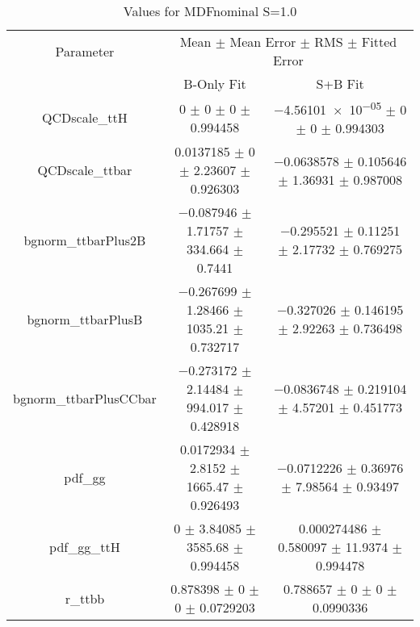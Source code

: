\begin{table}
\centering
\caption{Values for MDFnominal S=1.0}
\begin{tabular}{ccc}
\toprule
Parameter & \multicolumn{2}{c}{Mean $\pm$ Mean Error $\pm$ RMS $\pm$ Fitted Error}\\
 & B-Only Fit & S+B Fit\\
\midrule
QCDscale\_ttH & \num{0} $\pm$ \num{0} $\pm$ \num{0} $\pm$ \num{0.994458} & \num{-4.56101e-05} $\pm$ \num{0} $\pm$ \num{0} $\pm$ \num{0.994303}\\
QCDscale\_ttbar & \num{0.0137185} $\pm$ \num{0} $\pm$ \num{2.23607} $\pm$ \num{0.926303} & \num{-0.0638578} $\pm$ \num{0.105646} $\pm$ \num{1.36931} $\pm$ \num{0.987008}\\
bgnorm\_ttbarPlus2B & \num{-0.087946} $\pm$ \num{1.71757} $\pm$ \num{334.664} $\pm$ \num{0.7441} & \num{-0.295521} $\pm$ \num{0.11251} $\pm$ \num{2.17732} $\pm$ \num{0.769275}\\
bgnorm\_ttbarPlusB & \num{-0.267699} $\pm$ \num{1.28466} $\pm$ \num{1035.21} $\pm$ \num{0.732717} & \num{-0.327026} $\pm$ \num{0.146195} $\pm$ \num{2.92263} $\pm$ \num{0.736498}\\
bgnorm\_ttbarPlusCCbar & \num{-0.273172} $\pm$ \num{2.14484} $\pm$ \num{994.017} $\pm$ \num{0.428918} & \num{-0.0836748} $\pm$ \num{0.219104} $\pm$ \num{4.57201} $\pm$ \num{0.451773}\\
pdf\_gg & \num{0.0172934} $\pm$ \num{2.8152} $\pm$ \num{1665.47} $\pm$ \num{0.926493} & \num{-0.0712226} $\pm$ \num{0.36976} $\pm$ \num{7.98564} $\pm$ \num{0.93497}\\
pdf\_gg\_ttH & \num{0} $\pm$ \num{3.84085} $\pm$ \num{3585.68} $\pm$ \num{0.994458} & \num{0.000274486} $\pm$ \num{0.580097} $\pm$ \num{11.9374} $\pm$ \num{0.994478}\\
r\_ttbb & \num{0.878398} $\pm$ \num{0} $\pm$ \num{0} $\pm$ \num{0.0729203} & \num{0.788657} $\pm$ \num{0} $\pm$ \num{0} $\pm$ \num{0.0990336}\\
\bottomrule
\end{tabular}
\end{table}